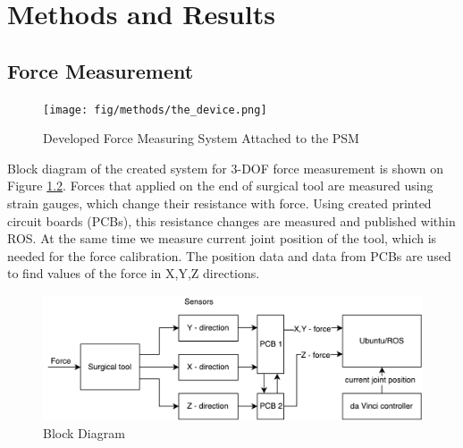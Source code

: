\chapter{Methods and Results}
\label{methods} %

\section{Force Measurement}
\label{sec:sysArch}

\begin{figure}[h]
	\begin{center}
		\texttt{[image: fig/methods/the\_device.png]}
	\end{center}
	\vspace{-4mm}
	\caption[Developed Force Measuring System Attached to the PSM]
	{Developed Force Measuring System Attached to the PSM}
	\label{fig:PSM_with_FF}
	\vspace{-2mm}
\end{figure}

Block diagram of the created system for 3-DOF force measurement is shown on Figure \ref{fig:BlockDiag}. Forces that applied on the end of surgical tool are measured using strain gauges, which change their resistance with force. Using created printed circuit boards (PCBs), this resistance changes are measured and published within ROS. At the same time we measure current joint position of the tool, which is needed for the force calibration. The position data and data from PCBs are used to find values of the force in X,Y,Z directions.

\begin{figure}[h]
	\begin{center}
		\includegraphics[width=140mm]{fig/methods/dbd2.pdf}
	\end{center}
	\vspace{-4mm}
	\caption[Block Diagram]
	{Block Diagram}
	\label{fig:BlockDiag}
	\vspace{-2mm}
\end{figure}

